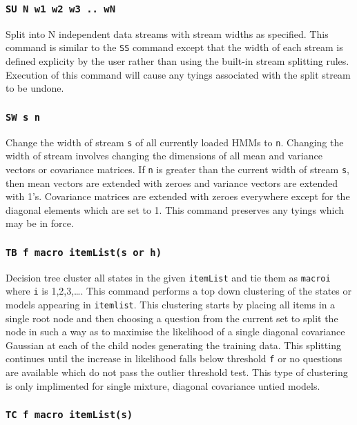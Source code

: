 \subsubsection*{\tt SU N w1 w2 w3 .. wN}

Split into N independent data streams with stream widths as specified.
This command is similar to the \texttt{SS} command except that the 
width of each stream is defined explicity by the user rather
than using the built-in stream splitting rules.
Execution of this command will cause
any tyings associated with the split stream to
be undone.

\subsubsection*{\tt SW s n}

Change the width of stream \texttt{s} of all currently loaded HMMs to 
\texttt{n}.  Changing the width of stream involves changing the dimensions
of all mean and variance vectors or covariance matrices.  If \texttt{n}
is greater than the current width of stream \texttt{s}, then mean vectors
are extended with zeroes and variance vectors are extended with 1's.
Covariance matrices are extended with zeroes everywhere except for the
diagonal elements which are set to 1.  This command preserves any
tyings which may be in force.

\subsubsection*{\tt TB f macro itemList(s or h)}

Decision tree cluster all states in the given \texttt{itemList} and 
tie them as \texttt{macroi} where \texttt{i} is 1,2,3,\ldots. 
This command performs a top down clustering of the states or
models appearing in \texttt{itemlist}.  This clustering starts by
placing all items in a single root node and then choosing a
question from the current set to split the node in such a way
as to maximise the likelihood of a single diagonal covariance
Gaussian at each of the child nodes generating the training data.
This splitting continues until the increase in likelihood falls
below threshold \texttt{f} or no questions are available which do
not pass the outlier threshold test.
This type of clustering is only implimented for single mixture,
diagonal covariance untied models.

\subsubsection*{\tt TC f macro itemList(s)}


